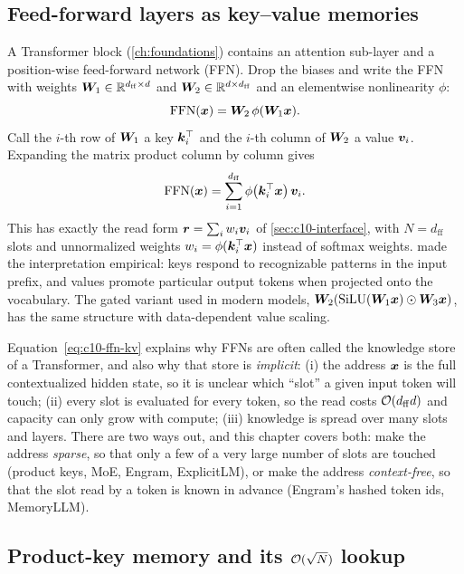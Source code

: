 \subsection{Feed-forward layers as key--value memories}\label{sec:c10-ffnkv}

A Transformer block (\cref{ch:foundations}) contains an attention sub-layer and a position-wise
feed-forward network (FFN). Drop the biases and write the FFN with weights
$\bm{W}_1 \in \mathbb{R}^{d_{\mathrm{ff}} \times d}$ and $\bm{W}_2 \in \mathbb{R}^{d \times d_{\mathrm{ff}}}$ and an
elementwise nonlinearity $\phi$:
\begin{equation}
  \mathrm{FFN}(\bm{x}) = \bm{W}_2\, \phi(\bm{W}_1 \bm{x}).
\end{equation}
Call the $i$-th row of $\bm{W}_1$ a key $\bm{k}_i^{\top}$ and the $i$-th column of $\bm{W}_2$ a value $\bm{v}_i$.
Expanding the matrix product column by column gives
\begin{equation}
  \mathrm{FFN}(\bm{x}) = \sum_{i=1}^{d_{\mathrm{ff}}} \phi\bigl(\bm{k}_i^{\top} \bm{x}\bigr)\, \bm{v}_i .
  \label{eq:c10-ffn-kv}
\end{equation}
This has exactly the read form $\bm{r} = \sum_i w_i \bm{v}_i$ of \cref{sec:c10-interface}, with
$N = d_{\mathrm{ff}}$ slots and unnormalized weights $w_i = \phi(\bm{k}_i^{\top}\bm{x})$ instead of softmax
weights. \citet{c01-geva2021ffn} made the interpretation empirical: keys respond to recognizable
patterns in the input prefix, and values promote particular output tokens when projected onto the
vocabulary. The gated variant used in modern models,
$\bm{W}_2(\operatorname{SiLU}(\bm{W}_1\bm{x}) \odot \bm{W}_3\bm{x})$, has the same structure with data-dependent value scaling.

Equation~\eqref{eq:c10-ffn-kv} explains why FFNs are often called the knowledge store of a
Transformer, and also why that store is \emph{implicit}: (i) the address $\bm{x}$ is the full
contextualized hidden state, so it is unclear which ``slot'' a given input token will touch;
(ii) every slot is evaluated for every token, so the read costs $\mathcal{O}(d_{\mathrm{ff}} d)$ and
capacity can only grow with compute; (iii) knowledge is spread over many slots and layers. There
are two ways out, and this chapter covers both: make the address \emph{sparse}, so that only a few
of a very large number of slots are touched (product keys, MoE, Engram, ExplicitLM), or make the
address \emph{context-free}, so that the slot read by a token is known in advance (Engram's hashed
token ids, MemoryLLM).

\subsection{Product-key memory and its \texorpdfstring{$\mathcal{O}(\sqrt{N})$}{O(sqrt N)} lookup}\label{sec:c10-pkm}

